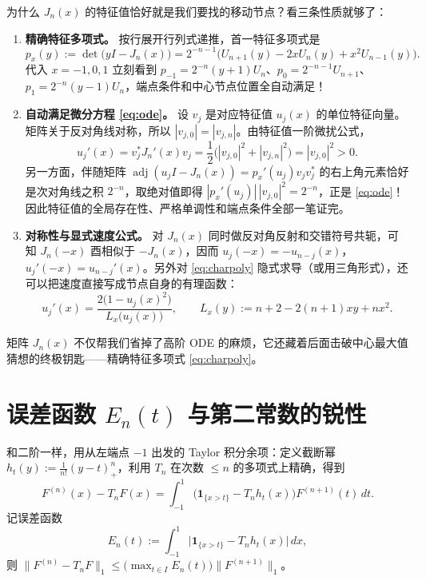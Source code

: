 \documentclass[UTF8,fontset=windows,a4paper,11pt]{ctexart}
\newcommand{\Lone}[1]{\lVert #1\rVert_1}
\begin{document}
为什么 $J_n(x)$ 的特征值恰好就是我们要找的移动节点？看三条性质就够了：
\begin{enumerate}
    \item \textbf{精确特征多项式。} 按行展开行列式递推，首一特征多项式是
    \begin{equation}
        p_x(y) := \det\bigl(yI-J_n(x)\bigr)
        = 2^{-n-1}\bigl(U_{n+1}(y)-2xU_n(y)+x^2U_{n-1}(y)\bigr).
        \label{eq:charpoly}
    \end{equation}
    代入 $x=-1,0,1$ 立刻看到 $p_{-1}=2^{-n}(y+1)U_n$、$p_0=2^{-n-1}U_{n+1}$、$p_1=2^{-n}(y-1)U_n$，端点条件和中心节点位置全自动满足！
    \item \textbf{自动满足微分方程 \eqref{eq:ode}。} 设 $v_j$ 是对应特征值 $u_j(x)$ 的单位特征向量。矩阵关于反对角线对称，所以 $|v_{j,0}|=|v_{j,n}|$。由特征值一阶微扰公式，
    \[
        u_j'(x) = v_j^* J_n'(x) v_j = \frac12\bigl(|v_{j,0}|^2+|v_{j,n}|^2\bigr) = |v_{j,0}|^2 > 0.
    \]
    另一方面，伴随矩阵 $\operatorname{adj}(u_j I-J_n(x))=p_x'(u_j)v_j v_j^*$ 的右上角元素恰好是次对角线之积 $2^{-n}$，取绝对值即得 $|p_x'(u_j)|\,|v_{j,0}|^2=2^{-n}$，正是 \eqref{eq:ode}！因此特征值的全局存在性、严格单调性和端点条件全部一笔证完。
    \item \textbf{对称性与显式速度公式。} 对 $J_n(x)$ 同时做反对角反射和交错符号共轭，可知 $J_n(-x)$ 酉相似于 $-J_n(x)$，因而 $u_j(-x)=-u_{n-j}(x)$，$u_j'(-x)=u_{n-j}'(x)$。另外对 \eqref{eq:charpoly} 隐式求导（或用三角形式），还可以把速度直接写成节点自身的有理函数：
    \begin{equation}
        u_j'(x) = \frac{2\bigl(1-u_j(x)^2\bigr)}{L_x\bigl(u_j(x)\bigr)},
        \qquad
        L_x(y) := n+2 - 2(n+1)xy + nx^2.
        \label{eq:speed}
    \end{equation}
\end{enumerate}

矩阵 $J_n(x)$ 不仅帮我们省掉了高阶 ODE 的麻烦，它还藏着后面击破中心最大值猜想的终极钥匙——精确特征多项式 \eqref{eq:charpoly}。

\section{误差函数 $E_n(t)$ 与第二常数的锐性}
\label{sec:sharp}

和二阶一样，用从左端点 $-1$ 出发的 Taylor 积分余项：定义截断幂 $h_t(y):=\frac{1}{n!}(y-t)_+^n$，利用 $T_n$ 在次数 $\le n$ 的多项式上精确，得到
\[
    F^{(n)}(x)-T_n F(x) = \int_{-1}^{1}\bigl(\mathbf{1}_{\{x>t\}}-T_n h_t(x)\bigr)F^{(n+1)}(t)\,dt.
\]
记误差函数
\[
    E_n(t) := \int_{-1}^{1}\bigl|\mathbf{1}_{\{x>t\}}-T_n h_t(x)\bigr|\,dx,
\]
则 $\Lone{F^{(n)}-T_n F}\le\bigl(\max_{t\in I}E_n(t)\bigr)\Lone{F^{(n+1)}}$。
\end{document}
